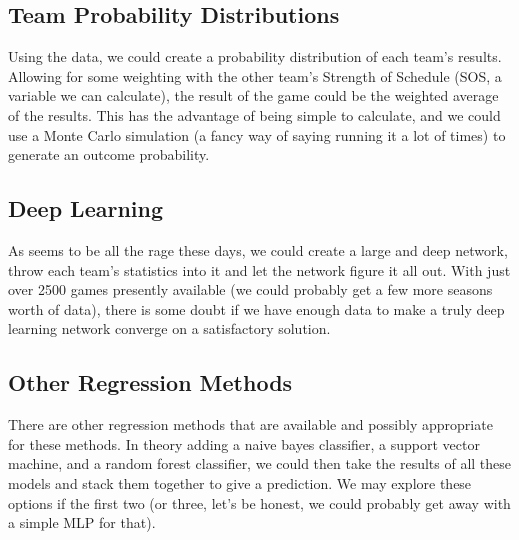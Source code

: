\documentclass[11pt,a4paper]{article}
\begin{document}
\subsection*{Team Probability Distributions}
Using the data, we could create a probability distribution of each team's results. Allowing for some weighting with the other team's Strength of Schedule (SOS, a variable we can calculate), the result of the game could be the weighted average of the results. This has the advantage of being simple to calculate, and we could use a Monte Carlo simulation (a fancy way of saying running it a lot of times) to generate an outcome probability.

\subsection*{Deep Learning}
As seems to be all the rage these days, we could create a large and deep network, throw each team's statistics into it and let the network figure it all out. With just over 2500 games presently available (we could probably get a few more seasons worth of data), there is some doubt if we have enough data to make a truly deep learning network converge on a satisfactory solution.

\subsection*{Other Regression Methods}
There are other regression methods that are available and possibly appropriate for these methods. In theory adding a naive bayes classifier, a support vector machine, and a random forest classifier, we could then take the results of all these models and stack them together to give a prediction. We may explore these options if the first two (or three, let's be honest, we could probably get away with a simple MLP for that).
\end{document}
